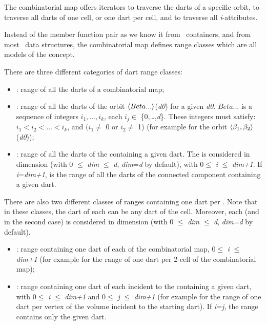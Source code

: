 The combinatorial map offers iterators to traverse the darts
of a specific orbit, to traverse all darts of one cell, or
one dart per cell, and to traverse all \emph{i}-attributes.

Instead of the  member function pair as we know it
from \stl\ containers, and from most \cgal\ data structures, the
combinatorial map defines range classes which are all models of the
 concept.

There are three different categories of dart range classes:
\begin{itemize}
\item {}: range of all the darts of a combinatorial map;
\item {}: range of all the darts of
  the orbit $\langle{}Beta...\rangle{}$(\emph{d0}) for a given \emph{d0}.  $Beta...$ is a
  sequence of integers $i_1,\ldots,i_k$, each $i_j \in$
  \{0,\ldots,\emph{d}\}. These integers must satisfy: $i_1<i_2<\ldots<i_k$,
  and $(i_1\neq$ 0 or $i_2 \neq$ 1) (for example
   for the orbit
  $\langle{}\beta_{1},\beta_{2}\rangle{}$(\emph{d0}));
\item {}: range of all the darts of
  the  containing a given dart. The  is considered in
  dimension  (with 0 $\leq$ \emph{dim} $\leq$ \emph{d}, \emph{dim}=\emph{d} by default),
  with 0$\leq$ \emph{i} $\leq$ \emph{dim+1}. If \emph{i}=\emph{dim+1},
   is the range of all the darts of
  the connected component containing a given dart.
\end{itemize}


There are also two different classes of ranges containing one dart per
. Note that in these classes, the dart of each  can
be any dart of the cell. Moreover, each  (and  in the
second case) is considered in dimension  (with 0 $\leq$ \emph{dim}
$\leq$ \emph{d}, \emph{dim=d} by default).
\begin{itemize}
\item {}: range containing one dart of
  each  of the combinatorial map, 0$\leq$ \emph{i} $\leq$ \emph{dim+1} (for
  example  for the range of one dart per
  2-cell of the combinatorial map);
\item {}: range
  containing one dart of each  incident to the 
  containing a given dart, with 0$\leq$ \emph{i} $\leq$ \emph{dim+1} and 0$\leq$ \emph{j}
  $\leq$ \emph{dim+1} (for example
   for the range of
  one dart per vertex of the volume incident to the starting dart).
  If \emph{i}=\emph{j}, the range contains only the given dart.
\end{itemize}

